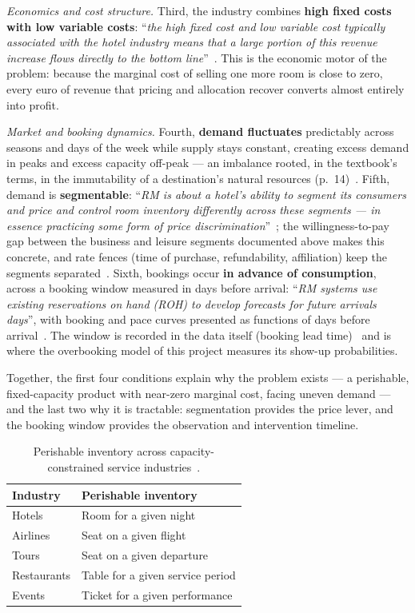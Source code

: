 \emph{Economics and cost structure.} Third, the industry combines \textbf{high fixed costs with low variable costs}: ``\emph{the high fixed cost and low variable cost typically associated with the hotel industry means that a large portion of this revenue increase flows directly to the bottom line}''~\cite{anderson2012}. This is the economic motor of the problem: because the marginal cost of selling one more room is close to zero, every euro of revenue that pricing and allocation recover converts almost entirely into profit.

\emph{Market and booking dynamics.} Fourth, \textbf{demand fluctuates} predictably across seasons and days of the week while supply stays constant, creating excess demand in peaks and excess capacity off-peak --- an imbalance rooted, in the textbook's terms, in the immutability of a destination's natural resources (p.~14)~\cite{goeldner2009}. Fifth, demand is \textbf{segmentable}: ``\emph{RM is about a hotel's ability to segment its consumers and price and control room inventory differently across these segments --- in essence practicing some form of price discrimination}''~\cite{anderson2012}; the willingness-to-pay gap between the business and leisure segments documented above makes this concrete, and rate fences (time of purchase, refundability, affiliation) keep the segments separated~\cite{anderson2012}. Sixth, bookings occur \textbf{in advance of consumption}, across a booking window measured in days before arrival: ``\emph{RM systems use existing reservations on hand (ROH) to develop forecasts for future arrivals days}'', with booking and pace curves presented as functions of days before arrival~\cite{anderson2012}. The window is recorded in the data itself (booking lead time)~\cite{antonio2019} and is where the overbooking model of this project measures its show-up probabilities.

Together, the first four conditions explain why the problem exists --- a perishable, fixed-capacity product with near-zero marginal cost, facing uneven demand --- and the last two why it is tractable: segmentation provides the price lever, and the booking window provides the observation and intervention timeline.

\begin{table}[H]
\centering
\caption{Perishable inventory across capacity-constrained service industries~\cite{kimes1989}.}
\label{tab:perishable}
\begin{tabular}{@{}ll@{}}
\toprule
\textbf{Industry} & \textbf{Perishable inventory} \\
\midrule
Hotels & Room for a given night \\
Airlines & Seat on a given flight \\
Tours & Seat on a given departure \\
Restaurants & Table for a given service period \\
Events & Ticket for a given performance \\
\bottomrule
\end{tabular}
\end{table}

